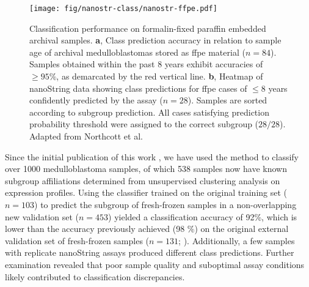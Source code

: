 \begin{figure}[ht]
	\begin{center}
		\texttt{[image: fig/nanostr-class/nanostr-ffpe.pdf]}
	\end{center}
	\caption[Classification performance on formalin-fixed paraffin embedded archival samples]
	{
	Classification performance on formalin-fixed paraffin embedded archival samples.
	\textbf{a}, Class prediction accuracy in relation to sample age of archival medulloblastomas stored as \gls{ffpe} material ($n = 84$). Samples obtained within the past 8 years exhibit accuracies of $\geq 95\%$, as demarcated by the red vertical line.
	\textbf{b}, Heatmap of nanoString data showing class predictions for \gls{ffpe} cases of $\leq 8$ years confidently predicted by the assay ($n = 28$). Samples are sorted according to subgroup prediction. All cases satisfying prediction probability threshold were assigned to the correct subgroup ($28/28$). Adapted from Northcott et al.
	}
	\label{fig:nanostr-ffpe}
\end{figure}

Since the initial publication of this work , we have used the method to classify over 1000 medulloblastoma samples, of which 538 samples now have known subgroup affiliations determined from unsupervised clustering analysis on expression profiles. Using the classifier trained on the original training set ($n = 103$) to predict the subgroup of fresh-frozen samples in a non-overlapping new validation set ($n = 453$) yielded a classification accuracy of 92\%, which is lower than the accuracy previously achieved (98 \%) on the original external validation set of fresh-frozen samples ($n = 131$; ). Additionally, a few samples with replicate nanoString assays produced different class predictions. Further examination revealed that poor sample quality and suboptimal assay conditions likely contributed to classification discrepancies. 

